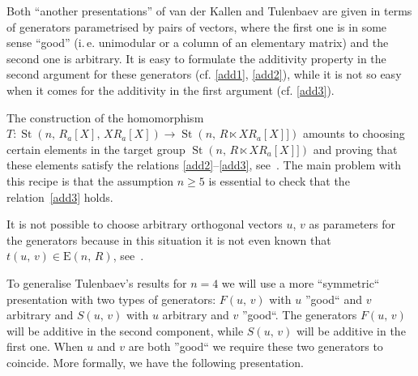 \documentclass[11pt]{amsart}
\theoremstyle{plain} \declaretheorem[name=Theorem, Refname={Theorem,Theorems}]{tm} \Crefname{tm}{Theorem}{Theorems}
\numberwithin{equation}{section}
\theoremstyle{definition} \newtheorem{df}[lm]{Definition} \Crefname{df}{Definition}{Definitions}
\theoremstyle{remark} \newtheorem{rk}[lm]{Remark} \Crefname{rk}{Remark}{Remarks}
\newcommand{\E}{{\mathrm{E}}}
\newcommand{\St}{\mathop{\mathrm{St}}\nolimits}
\begin{document}
Both ``another presentations'' of van der Kallen and Tulenbaev are given in terms of generators parametrised by pairs of vectors,
 where the first one is in some sense ``good'' (i.\,e. unimodular or a column of an elementary matrix) and the second one is arbitrary.
It is easy to formulate the additivity property in the second argument for these generators (cf. \eqref{add1}, \eqref{add2}),
while it is not so easy when it comes for the additivity in the first argument (cf. \eqref{add3}).

The construction of the homomorphism $T\colon\St(n,\,R_a[X],\,XR_a[X])\rightarrow\St(n,\,R\ltimes XR_a[X]])$
amounts to choosing certain elements in the target group $\St(n,\,R\ltimes XR_a[X]])$ and proving that these elements satisfy the relations \eqref{add2}--\eqref{add3}, see~\cite[Lemmas~1.2 and~1.3\,c)]{Tul}.
The main problem with this recipe is that the assumption $n\geq5$ is essential to check that the relation~\eqref{add3} holds.

It is not possible to choose arbitrary orthogonal vectors $u$, $v$ as parameters for the generators because in this situation it is not even known that $t(u,\,v)\in\E(n,\,R)$, see~\cite{Rao}. 

To generalise Tulenbaev's results for $n=4$ we will use a more ``symmetric`` presentation with two types of generators: 
$F(u,\,v)$ with $u$ ''good`` and $v$ arbitrary and $S(u,\,v)$ with $u$ arbitrary and $v$ ''good``.
The generators $F(u,\,v)$ will be additive in the second component, while $S(u,\,v)$ will be additive in the first one.
When $u$ and $v$ are both ''good`` we require these two generators to coincide.
More formally, we have the following presentation.
\end{document}
